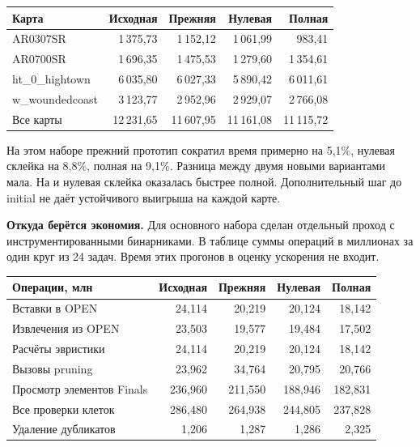 \documentclass[11pt,a4paper]{article}
\newcommand{\code}[1]{\texttt{\detokenize{#1}}}
\begin{document}
\begin{center}\small
\begin{tabular}{@{}lrrrr@{}}
\toprule
Карта & Исходная & Прежняя & Нулевая & Полная \\
\midrule
AR0307SR & 1\,375,73 & 1\,152,12 & 1\,061,99 & 983,41 \\
AR0700SR & 1\,696,35 & 1\,475,53 & 1\,279,60 & 1\,354,61 \\
ht\_0\_hightown & 6\,035,80 & 6\,027,33 & 5\,890,42 & 6\,011,61 \\
w\_woundedcoast & 3\,123,77 & 2\,952,96 & 2\,929,07 & 2\,766,08 \\
Все карты & 12\,231,65 & 11\,607,95 & 11\,161,08 & 11\,115,72 \\
\bottomrule
\end{tabular}
\end{center}

На этом наборе прежний прототип сократил время примерно на 5,1\%, нулевая склейка на 8,8\%, полная на 9,1\%. Разница между двумя новыми вариантами мала. На \code{AR0700SR} и \code{ht_0_hightown} нулевая склейка оказалась быстрее полной. Дополнительный шаг до initial не даёт устойчивого выигрыша на каждой карте.

\textbf{Откуда берётся экономия.} Для основного набора сделан отдельный проход с инструментированными бинарниками. В таблице суммы операций в миллионах за один круг из 24 задач. Время этих прогонов в оценку ускорения не входит.

\begin{center}\small
\begin{tabular}{@{}lrrrr@{}}
\toprule
Операции, млн & Исходная & Прежняя & Нулевая & Полная \\
\midrule
Вставки в OPEN & 24,114 & 20,219 & 20,124 & 18,142 \\
Извлечения из OPEN & 23,503 & 19,577 & 19,484 & 17,502 \\
Расчёты эвристики & 24,114 & 20,219 & 20,124 & 18,142 \\
Вызовы pruning & 23,962 & 34,764 & 20,795 & 20,766 \\
Просмотр элементов Finals & 236,960 & 211,550 & 188,946 & 182,831 \\
Все проверки клеток & 286,480 & 264,938 & 244,805 & 237,828 \\
Удаление дубликатов & 1,206 & 1,287 & 1,286 & 2,325 \\
\bottomrule
\end{tabular}
\end{center}
\end{document}
